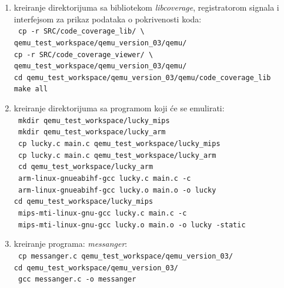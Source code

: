 \documentclass[12pt,oneside]{memoir}
\newcommand{\kod}[1]{\texttt{#1}}
\newcommand{\strano}[1]{\textit{#1}}
\begin{document}
\begin{enumerate}
\item kreiranje direktorijuma sa bibliotekom \strano{libcoverage}, registratorom signala i interfejsom za prikaz podataka o pokrivenosti koda: \\
\kod{ cp -r SRC/code\_coverage\_lib/ \textbackslash } \\
\hspace*{6mm} \kod{qemu\_test\_workspace/qemu\_version\_03/qemu/} \\
\kod{cp -r SRC/code\_coverage\_viewer/ \textbackslash } \\
\hspace*{6mm} \kod{qemu\_test\_workspace/qemu\_version\_03/qemu/} \\
\kod{cd qemu\_test\_workspace/qemu\_version\_03/qemu/code\_coverage\_lib} \\
\kod{make all}
\item kreiranje direktorijuma sa programom koji će se emulirati: \\
\kod{ mkdir qemu\_test\_workspace/lucky\_mips} \\
\kod{ mkdir qemu\_test\_workspace/lucky\_arm} \\
\kod{ cp lucky.c main.c qemu\_test\_workspace/lucky\_mips} \\
\kod{ cp lucky.c main.c qemu\_test\_workspace/lucky\_arm} \\
\kod{ cd qemu\_test\_workspace/lucky\_arm} \\
\kod{ arm-linux-gnueabihf-gcc lucky.c main.c -c} \\
\kod{ arm-linux-gnueabihf-gcc lucky.o main.o -o lucky} \\
\kod{cd qemu\_test\_workspace/lucky\_mips} \\
\kod{ mips-mti-linux-gnu-gcc lucky.c main.c -c} \\
\kod{ mips-mti-linux-gnu-gcc lucky.o main.o -o lucky -static} 
\item kreiranje programa: \strano{messanger}: \\
\kod{ cp messanger.c qemu\_test\_workspace/qemu\_version\_03/} \\
\kod{cd qemu\_test\_workspace/qemu\_version\_03/} \\
\kod{ gcc messanger.c -o messanger}
\end{enumerate}
\end{document}
